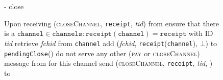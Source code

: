   \begin{figure}[H]
    \begin{systembox}{\fpaynet{} - close}
      \begin{algorithmic}[1]
        \State Upon receiving (\textsc{closeChannel}, \texttt{receipt},
        \textit{tid}) from \alice
        \Indent
          \State ensure that there is a $\mathtt{channel} \in \mathtt{channels}
          : \mathtt{receipt}\left(\mathtt{channel}\right) = \mathtt{receipt}$
          with ID \textit{tid}
          \State retrieve \textit{fchid} from \texttt{channel}
          \label{alg:fpaynet:close:retrieve}
          \State add (\textit{fchid}, \texttt{receipt}(\texttt{channel}),
          $\bot$) to \texttt{pendingClose}(\alice)
          \label{alg:fpaynet:close:mark}
          \State do not serve any other (\textsc{pay} or \textsc{closeChannel})
          message from \alice{} for this channel
          \label{alg:fpaynet:close:noserve}
          \State send (\textsc{closeChannel}, \texttt{receipt}, \textit{tid},
          \alice) to \simulator
          \label{alg:fpaynet:close:send}
        \EndIndent
        \Statex


\end{algorithmic}
\end{systembox}
\end{figure}
